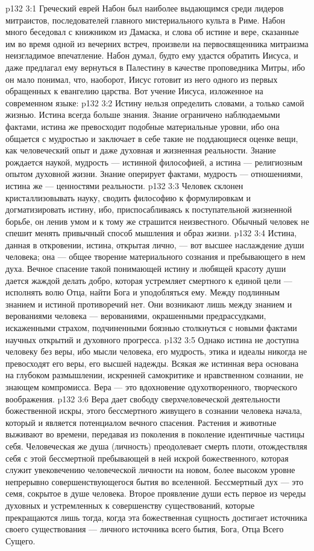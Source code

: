 \vs p132 3:1 Греческий еврей Набон был наиболее выдающимся среди лидеров митраистов, последователей главного мистериального культа в Риме. Набон много беседовал с книжником из Дамаска, и слова об истине и вере, сказанные им во время одной из вечерних встреч, произвели на первосвященника митраизма неизгладимое впечатление. Набон думал, будто ему удастся обратить Иисуса, и даже предлагал ему вернуться в Палестину в качестве проповедника Митры, ибо он мало понимал, что, наоборот, Иисус готовит из него одного из первых обращенных к евангелию царства. Вот учение Иисуса, изложенное на современном языке:
\vs p132 3:2 \pc Истину нельзя определить словами, а только самой жизнью. Истина всегда больше знания. Знание ограничено наблюдаемыми фактами, истина же превосходит подобные материальные уровни, ибо она общается с мудростью и заключает в себе такие не поддающиеся оценке вещи, как человеческий опыт и даже духовная и жизненная реальности. Знание рождается наукой, мудрость --- истинной философией, а истина --- религиозным опытом духовной жизни. Знание оперирует фактами, мудрость --- отношениями, истина же --- ценностями реальности.
\vs p132 3:3 Человек склонен кристаллизовывать науку, сводить философию к формулировкам и догматизировать истину, ибо, приспосабливаясь к поступательной жизненной борьбе, он ленив умом и к тому же страшится неизвестного. Обычный человек не спешит менять привычный способ мышления и образ жизни.
\vs p132 3:4 Истина, данная в откровении, истина, открытая лично, --- вот высшее наслаждение души человека; она --- общее творение материального сознания и пребывающего в нем духа. Вечное спасение такой понимающей истину и любящей красоту души дается жаждой делать добро, которая устремляет смертного к единой цели --- исполнять волю Отца, найти Бога и уподобляться ему. Между подлинным знанием и истиной противоречий нет. Они возникают лишь между знанием и верованиями человека --- верованиями, окрашенными предрассудками, искаженными страхом, подчиненными боязнью столкнуться с новыми фактами научных открытий и духовного прогресса.
\vs p132 3:5 Однако истина не доступна человеку без веры, ибо мысли человека, его мудрость, этика и идеалы никогда не превосходят его веры, его высшей надежды. Всякая же истинная вера основана на глубоком размышлении, искренней самокритике и нравственном сознании, не знающем компромисса. Вера --- это вдохновение одухотворенного, творческого воображения.
\vs p132 3:6 Вера дает свободу сверхчеловеческой деятельности божественной искры, этого бессмертного живущего в сознании человека начала, который и является потенциалом вечного спасения. Растения и животные выживают во времени, передавая из поколения в поколение идентичные частицы себя. Человеческая же душа (личность) преодолевает смерть плоти, отождествляя себя с этой бессмертной пребывающей в ней искрой божественного, которая служит увековечению человеческой личности на новом, более высоком уровне непрерывно совершенствующегося бытия во вселенной. Бессмертный дух --- это семя, сокрытое в душе человека. Второе проявление души есть первое из череды духовных и устремленных к совершенству существований, которые прекращаются лишь тогда, когда эта божественная сущность достигает источника своего существования --- личного источника всего бытия, Бога, Отца Всего Сущего.
